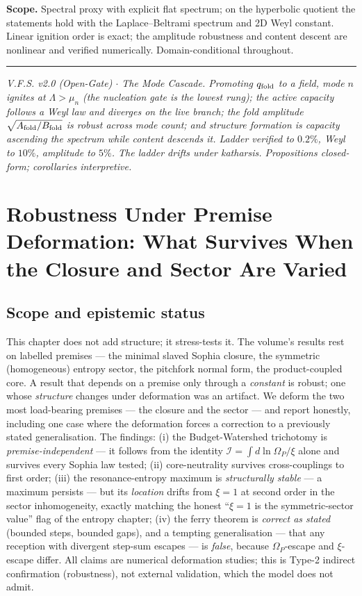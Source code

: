 \documentclass[11pt,a4paper,oneside]{book}
\newcommand{\Op}{\Omega_P}
\newcommand{\qf}{q_{\rm fold}}
\newcommand{\Afold}{A_{\rm fold}}
\newcommand{\Bfold}{B_{\rm fold}}
\newcommand{\Ib}{\mathcal I}
\theoremstyle{plain}
\theoremstyle{definition}
\theoremstyle{remark}
\begin{document}
\textbf{Scope.} Spectral proxy with explicit flat spectrum; on the hyperbolic quotient the statements
hold with the Laplace--Beltrami spectrum and 2D Weyl constant. Linear ignition order is exact; the
amplitude robustness and content descent are nonlinear and verified numerically. Domain-conditional
throughout.

\vspace{0.5em}
\hrule
\smallskip
\noindent\footnotesize\emph{V.F.S. v2.0 (Open-Gate) $\cdot$ The Mode Cascade. Promoting $\qf$ to a
field, mode $n$ ignites at $\Lambda>\mu_n$ (the nucleation gate is the lowest rung); the active
capacity follows a Weyl law and diverges on the live branch; the fold amplitude $\sqrt{\Afold/\Bfold}$
is robust across mode count; and structure formation is capacity ascending the spectrum while content
descends it. Ladder verified to $0.2\%$, Weyl to $10\%$, amplitude to $5\%$. The ladder drifts under
katharsis. Propositions closed-form; corollaries interpretive.}

\chapter{Robustness Under Premise Deformation: What Survives When the Closure and Sector Are Varied}

\section*{Scope and epistemic status}
This chapter does not add structure; it stress-tests it. The volume's results rest on labelled
premises --- the minimal slaved Sophia closure, the symmetric (homogeneous) entropy sector, the
pitchfork normal form, the product-coupled core. A result that depends on a premise only through a
\emph{constant} is robust; one whose \emph{structure} changes under deformation was an artifact. We
deform the two most load-bearing premises --- the closure and the sector --- and report honestly,
including one case where the deformation forces a correction to a previously stated generalisation.
The findings: (i) the Budget-Watershed trichotomy is \emph{premise-independent} --- it follows from
the identity $\Ib=\int d\ln\Op/\xi$ alone and survives every Sophia law tested; (ii) core-neutrality
survives cross-couplings to first order; (iii) the resonance-entropy maximum is \emph{structurally
stable} --- a maximum persists --- but its \emph{location} drifts from $\xi=1$ at second order in the
sector inhomogeneity, exactly matching the honest ``$\xi=1$ is the symmetric-sector value'' flag of
the entropy chapter; (iv) the ferry theorem is \emph{correct as stated} (bounded steps, bounded gaps),
and a tempting generalisation --- that any reception with divergent step-sum escapes --- is
\emph{false}, because $\Op$-escape and $\xi$-escape differ. All claims are numerical deformation
studies; this is Type-2 indirect confirmation (robustness), not external validation, which the model
does not admit.
\end{document}
